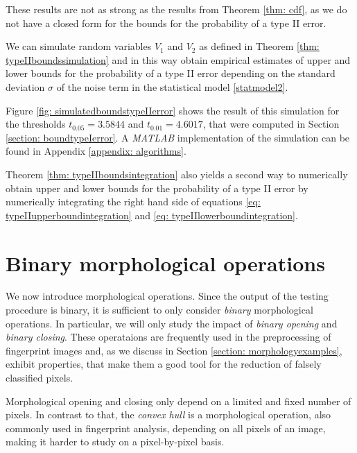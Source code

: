 \documentclass[a4paper,12pt]{article}
\theoremstyle{plain}
\theoremstyle{definition}
\begin{document}
These results are not as strong as the results from Theorem \ref{thm: cdf}, as we do not have a closed form for the bounds for the probability of a type II error.

We can simulate random variables $V_1$ and $V_2$ as defined in Theorem \ref{thm: typeIIboundssimulation} and in this way obtain empirical estimates of upper and lower bounds for the probability of a type II error depending on the standard deviation $\sigma$ of the noise term in the statistical model \eqref{statmodel2}.

Figure \ref{fig: simulatedboundstypeIIerror} shows the result of this simulation for the thresholds $t_{0.05} = 3.5844$ and $t_{0.01} = 4.6017$, that were computed in Section \ref{section: boundtypeIerror}. A \emph{MATLAB} implementation of the simulation can be found in Appendix \ref{appendix: algorithms}.



Theorem \ref{thm: typeIIboundsintegration} also yields a second way to numerically obtain upper and lower bounds for the probability of a type II error by numerically integrating the right hand side of equations \eqref{eq: typeIIupperboundintegration} and \eqref{eq: typeIIlowerboundintegration}.

\newpage



\section{Binary morphological operations}\label{section: morphologicaloperations}

We now introduce morphological operations. Since the output of the testing procedure is binary, it is sufficient to only consider \emph{binary} morphological operations. In particular, we will only study the impact of \emph{binary opening} and \emph{binary closing}. These operataions are frequently used in the preprocessing of fingerprint images and, as we discuss in Section \ref{section: morphologyexamples}, exhibit properties, that make them a good tool for the reduction of falsely classified pixels.

Morphological opening and closing only depend on a limited and fixed number of pixels. In contrast to that, the \emph{convex hull} is a morphological operation, also commonly used in fingerprint analysis, depending on all pixels of an image, making it harder to study on a pixel-by-pixel basis.
\end{document}
